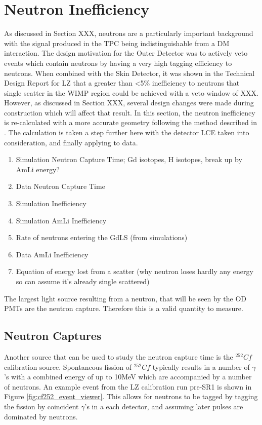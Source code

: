 \section{Neutron Inefficiency}
\par
As discussed in Section XXX, neutrons are a particularly important background with the signal produced in the TPC being indistinguishable from a DM interaction.
The design motivation for the Outer Detector was to actively veto events which contain neutrons by having a very high tagging efficiency to neutrons.
When combined with the Skin Detector, it was shown in the Technical Design Report for LZ that a greater than <5\% inefficiency to neutrons that single scatter in the WIMP region could be achieved with a veto window of XXX.
However, as discussed in Section XXX, several design changes were made during construction which will affect that result.
In this section, the neutron inefficiency is re-calculated with a more accurate geometry following the method described in \cite{sallyshaw_thesis_ref}.
The calculation is taken a step further here with the detector LCE taken into consideration, and finally applying to data. 



\begin{tcolorbox}[colback=red!5!white, colframe=red!50!black, title=Key Plots]
\begin{enumerate}
    \item Simulation Neutron Capture Time; Gd isotopes, H isotopes, break up by AmLi energy?
    \item Data Neutron Capture Time
    \item Simulation Inefficiency
    \item Simulation AmLi Inefficiency
    \item Rate of neutrons entering the GdLS (from simulations)
    \item Data AmLi Inefficiency
    \item Equation of energy lost from a scatter (why neutron loses hardly any energy so can assume it's already single scattered)
\end{enumerate}
\end{tcolorbox}

\par
The largest light source resulting from a neutron, that will be seen by the OD PMTs are the neutron capture.
Therefore this is a valid quantity to measure.

\subsection{Neutron Captures}
\par
Another source that can be used to study the neutron capture time is the ${}^{252}{Cf}$ calibration source.
Spontaneous fission of ${}^{252}{Cf}$ typically results in a number of $\gamma$'s with a combined energy of up to 10MeV which are accompanied by a number of neutrons.
An example event from the LZ calibration run pre-SR1 is shown in Figure \ref{fig:cf252_event_viewer}.
This allows for neutrons to be tagged by tagging the fission by coincident $\gamma$'s in a each detector, and assuming later pulses are dominated by neutrons.

